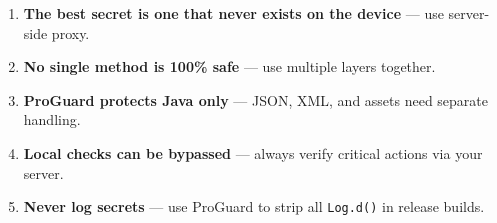 \documentclass[11pt,a4paper]{article}
\begin{document}
\begin{summarybox}
\begin{enumerate}[leftmargin=*]
\item \textbf{The best secret is one that never exists on the device} --- use server-side proxy.
\item \textbf{No single method is 100\% safe} --- use multiple layers together.
\item \textbf{ProGuard protects Java only} --- JSON, XML, and assets need separate handling.
\item \textbf{Local checks can be bypassed} --- always verify critical actions via your server.
\item \textbf{Never log secrets} --- use ProGuard to strip all \texttt{Log.d()} in release builds.
\end{enumerate}
\end{summarybox}
\end{document}
